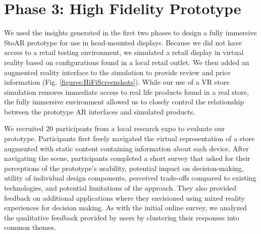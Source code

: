 \section{Phase 3: High Fidelity Prototype}
We used the insights generated in the first two phases to design a fully immersive StoAR prototype for use in head-mounted displays. Because we did not have access to a retail testing environment, we simulated a retail display in virtual reality based on configurations found in a local retail outlet. We then added an augmented reality interface to the simulation to provide review and price information (Fig. \ref{figures:HiFiScreenshots}). While our use of a VR store simulation removes immediate access to real life products found in a real store, the fully immersive environment allowed us to closely control the relationship between the prototype AR interfaces and simulated products. %

We recruited 20 participants from a local research expo to evaluate our prototype. Participants first freely navigated the virtual representation of a store augmented with static content containing information about each device. After navigating the scene, participants completed a short survey that asked for their perceptions of the prototype's usability, potential impact on decision-making, utility of individual design components, perceived trade-offs compared to existing technologies, and potential limitations of the approach. They also provided feedback on additional applications where they envisioned using mixed reality experiences for decision making. As with the initial online survey, we analyzed the qualitative feedback provided by users by clustering their responses into common themes. 

